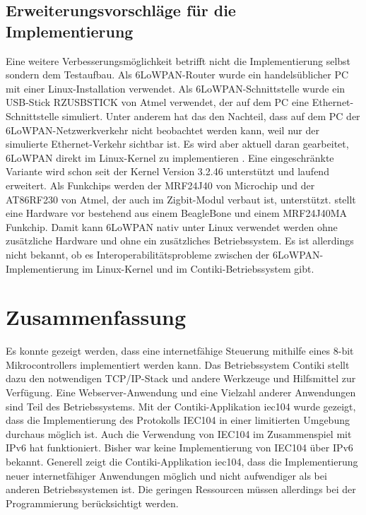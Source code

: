 \subsection{Erweiterungsvorschläge für die Implementierung}



Eine weitere Verbesserungsmöglichkeit betrifft nicht die Implementierung selbst sondern dem Testaufbau. Als 6LoWPAN-Router wurde ein handelsüblicher PC mit einer Linux-Installation verwendet. Als 6LoWPAN-Schnittstelle wurde ein USB-Stick RZUSBSTICK von Atmel verwendet, der auf dem PC eine Ethernet-Schnittstelle simuliert. Unter anderem hat das den Nachteil, dass auf dem PC der 6LoWPAN-Netzwerkverkehr nicht beobachtet werden kann, weil nur der simulierte Ethernet-Verkehr sichtbar ist. Es wird aber aktuell daran gearbeitet, 6LoWPAN direkt im Linux-Kernel zu implementieren \citep{Ott2012}. Eine eingeschränkte Variante wird schon seit der Kernel Version 3.2.46 unterstützt und laufend erweitert. Als Funkchips werden der MRF24J40 von Microchip und der AT86RF230 von Atmel, der auch im Zigbit-Modul verbaut ist, unterstützt. \citeauthor{Ott2012} stellt eine Hardware vor bestehend aus einem BeagleBone und einem MRF24J40MA Funkchip. Damit kann 6LoWPAN nativ unter Linux verwendet werden ohne zusätzliche Hardware und ohne ein zusätzliches Betriebssystem. Es ist allerdings nicht bekannt, ob es Interoperabilitätsprobleme zwischen der 6LoWPAN-Implementierung im Linux-Kernel und im Contiki-Betriebssystem gibt.

\section{Zusammenfassung}

Es konnte gezeigt werden, dass eine internetfähige Steuerung mithilfe eines 8-bit Mikrocontrollers implementiert werden kann. Das Betriebssystem Contiki stellt dazu den notwendigen TCP/IP-Stack und andere Werkzeuge und Hilfsmittel zur Verfügung. Eine Webserver-Anwendung und eine Vielzahl anderer Anwendungen sind Teil des Betriebssystems. Mit der Contiki-Applikation iec104 wurde gezeigt, dass die Implementierung des Protokolls IEC104 in einer limitierten Umgebung durchaus möglich ist. Auch die Verwendung von IEC104 im Zusammenspiel mit IPv6 hat funktioniert. Bisher war keine Implementierung von IEC104 über IPv6 bekannt. Generell zeigt die Contiki-Applikation iec104, dass die Implementierung neuer internetfähiger Anwendungen möglich und nicht aufwendiger als bei anderen Betriebssystemen ist. Die geringen Ressourcen müssen allerdings bei der Programmierung berücksichtigt werden.

